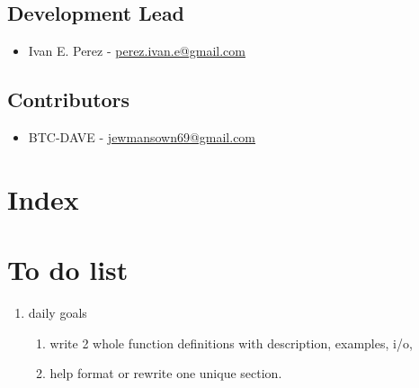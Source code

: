 \documentclass[refman]{article}
\begin{document}
 \subsection{Development Lead}
 \begin{itemize}
 	\item Ivan E. Perez -  \href{mailto:perez.ivan.e@gmail.com}{perez.ivan.e@gmail.com}
 \end{itemize}
 \subsection{Contributors}
 \begin{itemize}
 	\item BTC-DAVE - \href{mailto:jewmansown69@gmail.com}{jewmansown69@gmail.com}
 \end{itemize}
 \newpage
 
 



 \section{Index}
 \section{To do list}
 \begin{enumerate}
 	\item daily goals
 	\begin{enumerate}
 		\item write 2 whole function definitions with description, examples, i/o, 
 		\item help format or rewrite one unique section. 
 	\end{enumerate}
 \end{enumerate}
 

 

 
\end{document}
